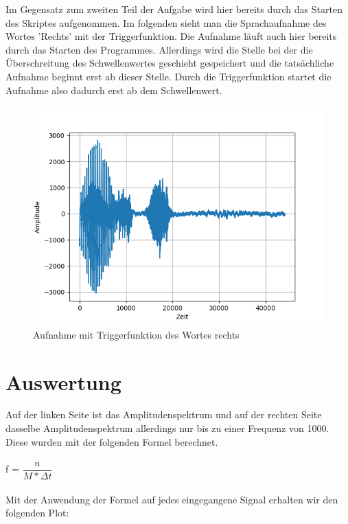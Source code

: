 \documentclass[12pt, oneside, a4paper, \docLanguage]{report}
\begin{document}
\newline
Im Gegensatz zum zweiten Teil der Aufgabe wird hier bereits durch das Starten des Skriptes aufgenommen.
\newpage
Im folgenden sieht man die Sprachaufnahme des Wortes 'Rechts' mit der Triggerfunktion.
Die Aufnahme läuft auch hier bereits durch das Starten des Programmes.
\newline
Allerdings wird die Stelle bei der die Überschreitung des Schwellenwertes geschieht gespeichert und die tatsächliche Aufnahme beginnt erst ab dieser Stelle.
\newline
Durch die Triggerfunktion startet die Aufnahme also dadurch erst ab dem Schwellenwert.
\begin{figure}[H]
	\centering
	\includegraphics[width=.75\linewidth]{../data/img/rechtsamp.png}
	\caption{Aufnahme mit Triggerfunktion des Wortes rechts}
	\label{img:aua}
\end{figure}

\newpage
\section{Auswertung}
\label{chap:VERSUCH_1_AUSWERTUNG}
Auf der linken Seite ist das Amplitudenspektrum und auf der rechten Seite dasselbe Amplitudenspektrum allerdings nur bis zu einer Frequenz von 1000.
\newline
Diese wurden mit der folgenden Formel berechnet. 
\\~\\
f = $\dfrac{n}{M * \Delta t}$
\\~\\
\newline
Mit der Anwendung der Formel auf jedes eingegangene Signal erhalten wir den folgenden Plot:
\end{document}
